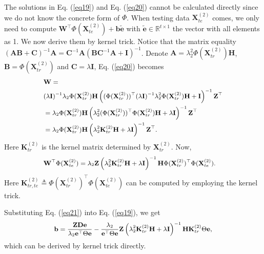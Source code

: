 \documentclass[10pt,journal,compsoc]{IEEEtran}
\begin{document}
The solutions in Eq. (\ref{eq19}) and Eq. (\ref{eq20}) cannot be calculated directly since we do not know the concrete form of $\Phi$. When testing data $\mathbf{X}_{te}^{(2)}$ comes, we only need to compute $\mathbf{W}^\top \Phi(\mathbf{X}_{te}^{(2)})+\mathbf{b}\tilde{\mathbf{e}}$ with
$\tilde{\mathbf{e}} \in \mathbb{R}^{t\times 1}$ the vector with all elements as 1. We now derive them by kernel trick. Notice that the matrix equality $(\mathbf{AB}+\mathbf{C})^{-1} \mathbf{A} = \mathbf{C}^{-1} \mathbf{A} (\mathbf{B}\mathbf{C}^{-1}\mathbf{A}+ \mathbf{I})^{-1}$. Denote $\mathbf{A} = \lambda_2^2 \Phi(\mathbf{X}_{tr}^{(2)}) \mathbf{H}$, $\mathbf{B} = \Phi(\mathbf{X}_{tr}^{(2)})$ and $\mathbf{C}=\lambda \mathbf{I}$, Eq. (\ref{eq20}) becomes
\begin{equation}
\label{eq21}
\small{
\begin{split}
& \mathbf{W} = \\
& (\lambda \mathbf{I})^{-1} \lambda_2 \Phi(\mathbf{X}_{tr}^{(2)}) \mathbf{H}
\left( (\Phi(\mathbf{X}_{tr}^{(2)}))^\top (\lambda \mathbf{I})^{-1} \lambda_2^2 \Phi(\mathbf{X}_{tr}^{(2)}) \mathbf{H} + \mathbf{I} \right)^{-1} \mathbf{Z}^\top\\
& = \lambda_2 \Phi(\mathbf{X}_{tr}^{(2)}) \mathbf{H} \left( \lambda_2^2 (\Phi(\mathbf{X}_{tr}^{(2)}))^\top \Phi(\mathbf{X}_{tr}^{(2)})\mathbf{H} +\lambda \mathbf{I} \right)^{-1}  \mathbf{Z}^\top\\
& = \lambda_2 \Phi(\mathbf{X}_{tr}^{(2)}) \mathbf{H} \left( \lambda_2^2 \mathbf{K}_{tr}^{(2)} \mathbf{H} +\lambda \mathbf{I} \right)^{-1}  \mathbf{Z}^\top.\\
\end{split}}
\end{equation}
Here $\mathbf{K}_{tr}^{(2)}$ is the kernel matrix determined by $\mathbf{X}_{tr}^{(2)}$. Now,
\begin{equation}
\label{eq22}
\small{
\begin{split}
& \mathbf{W}^\top \Phi(\mathbf{X}_{te}^{(2)}) =
\lambda_2 \mathbf{Z} \left( \lambda_2^2 \mathbf{K}_{tr}^{(2)} \mathbf{H} +\lambda \mathbf{I} \right)^{-1} \mathbf{H} \Phi(\mathbf{X}_{tr}^{(2)})^\top \Phi(\mathbf{X}_{te}^{(2)}).
\end{split}}
\end{equation}
Here $\mathbf{K}_{tr,te}^{(2)} \triangleq \Phi(\mathbf{X}_{tr}^{(2)})^\top \Phi(\mathbf{X}_{te}^{(2)})$ can be computed by employing the kernel trick.

Substituting Eq. (\ref{eq21}) into Eq. (\ref{eq19}), we get
\begin{equation}
\label{eq23}
\small{
\begin{split}
\mathbf{b} = \frac{\mathbf{ZDe}}{\lambda_2 \mathbf{e}^\top \Theta \mathbf{e}}-
\frac{\lambda_2}{\mathbf{e}^\top \Theta \mathbf{e}}
 \mathbf{Z} \left( \lambda_2^2 \mathbf{K}_{tr}^{(2)} \mathbf{H} +\lambda \mathbf{I} \right)^{-1} \mathbf{H} \mathbf{K}_{tr}^{(2)} \Theta \mathbf{e},
\end{split}}
\end{equation}
which can be derived by kernel trick directly.
\end{document}
